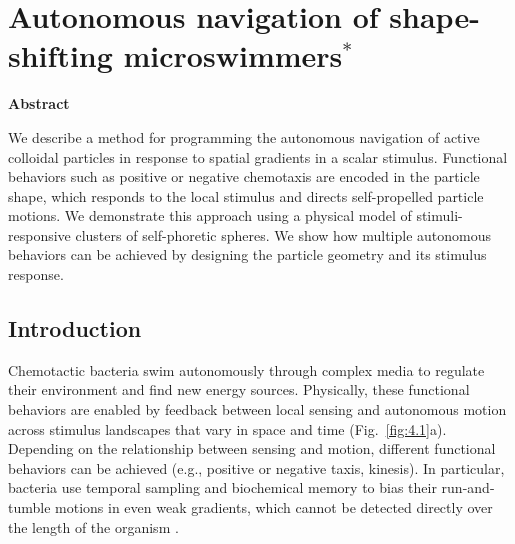 \chapter{Autonomous navigation of shape-shifting microswimmers$^{*}$}
\begin{center}
\vspace*{1\baselineskip}
\textbf{Abstract}
\end{center}

We describe a method for programming the autonomous navigation of active colloidal particles in response to spatial gradients in a scalar stimulus. Functional behaviors such as positive or negative chemotaxis are encoded in the particle shape, which responds to the local stimulus and directs self-propelled particle motions. We demonstrate this approach using a physical model of stimuli-responsive clusters of self-phoretic spheres. We show how multiple autonomous behaviors can be achieved by designing the particle geometry and its stimulus response.

\section{Introduction}
Chemotactic bacteria swim autonomously through complex media to regulate their environment and find new energy sources. Physically, these functional behaviors are enabled by feedback between local sensing and autonomous motion across stimulus landscapes that vary in space and time (Fig.\ \ref{fig:4.1}a). Depending on the relationship between sensing and motion, different functional behaviors can be achieved (e.g., positive or negative taxis, kinesis). In particular, bacteria use temporal sampling and biochemical memory to bias their run-and-tumble motions in even weak gradients, which cannot be detected directly over the length of the organism \autocite{cates2012diffusive}.  

